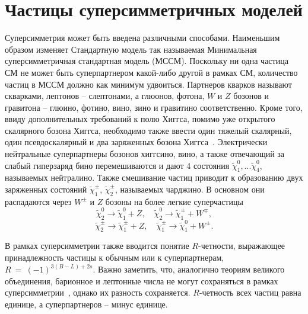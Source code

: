 \documentclass[a4paper, 10pt, twocolumn]{article}
\begin{document}

\section{Частицы суперсимметричных моделей}

Суперсимметрия может быть введена различными способами. Наименьшим 
образом изменяет Стандартную модель так называемая Минимальная 
суперсимметричная стандартная модель (МССМ). Поскольку ни одна частица 
СМ не может быть суперпартнером какой-либо другой в рамках СМ, 
количество частиц в МССМ должно как минимум удвоиться. Партнеров 
кварков называют скварками, лептонов -- слептонами, а глюонов, фотона, 
$W$ и $Z$ бозонов и гравитона -- глюино, фотино, вино, зино и гравитино 
соответственно. Кроме того, ввиду дополнительных требований к полю 
Хиггса, помимо уже открытого скалярного бозона Хиггса, необходимо также 
ввести один тяжелый скалярный, один псевдоскалярный и два заряженных 
бозона Хиггса~\cite{intro2005}. Электрически нейтральные суперпартнеры 
бозонов хиггсино, вино, а также отвечающий за слабый гиперзаряд бино 
перемешиваются и дают 4 состояния $\tilde{\chi}^0_1, ... 
\tilde{\chi}^0_4$, называемых нейтралино. Также смешивание частиц 
приводит к образованию двух заряженных состояний $\tilde{\chi}^\pm_1$, 
$\tilde{\chi}^\pm_2$, называемых чарджино. В основном они распадаются 
через $W^\pm$ и $Z$ бозоны на более легкие суперчастицы
$$ \tilde{\chi}^0_2 \to \tilde{\chi}^0_1 + Z,
\quad
\tilde{\chi}^0_2 \to \tilde{\chi}^\pm_1 + W^\mp, $$
$$ \tilde{\chi}^\pm_2 \to \tilde{\chi}^\pm_1 + Z,
\quad
\tilde{\chi}^\pm_1 \to \tilde{\chi}^0_1 + W^\pm. $$

В рамках суперсимметрии также вводится понятие $R$-четности, выражающее 
принадлежность частицы к обычным или к суперпартнерам, 
$R~=~\left(-1\right) ^ {3(B-L) + 2s}$. Важно заметить, что, аналогично 
теориям великого объединения, барионное и лептонные числа не могут 
сохраняться в рамках суперсимметрии~\cite{baryon-lepton-violation}, 
однако их разность сохраняется. $R$-четность всех частиц равна единице, 
а суперпартнеров -- минус единице.
\end{document}
